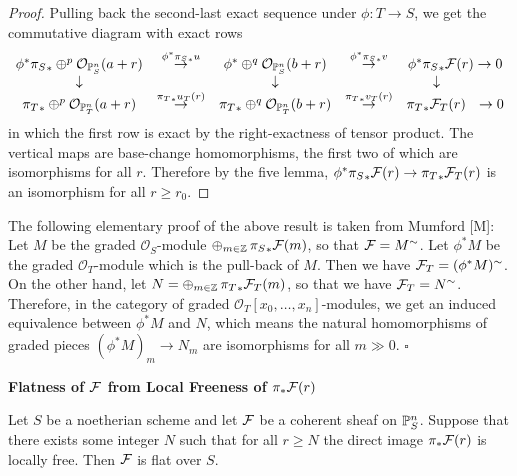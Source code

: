 \begin{proof}
Pulling back the second-last exact sequence under $\phi: T\to S$,
we get the commutative diagram with exact rows
$$\begin{array}{ccccc}
\phi^*{\pi_S}_* \oplus^p {\mathcal O}_{\mathbb{P}^n_S}(a+r) &
\stackrel{\phi^*{\pi_S}_*u}{\to} &
\phi^* \oplus^q {\mathcal O}_{\mathbb{P}^n_S}(b+r) &
\stackrel{\phi^*{\pi_S}_*v}{\to} &
\phi^*{\pi_S}_* \mathcal{F}(r) \to  0 \\
\downarrow &   & \downarrow & & \downarrow ~~~~~~~~ \\
{\pi_T}_* \oplus^p {\mathcal O}_{\mathbb{P}^n_T}(a+r) &
\stackrel{{\pi_T}_*u_T(r)}{\to} &
{\pi_T}_*   \oplus^q {\mathcal O}_{\mathbb{P}^n_T}(b+r) &
\stackrel{{\pi_T}_*v_T(r)}{\to} &
{\pi_T}_* \mathcal{F}_T(r) ~~ \to  0
\end{array}
$$
in which the first row is exact by the right-exactness of tensor product.
The vertical maps are base-change homomorphisms, the first two
of which are isomorphisms for all $r$.
Therefore by the five lemma,
$\phi^*{\pi_S}_* \mathcal{F}(r) \to {\pi_T}_* \mathcal{F}_T(r)$ is an isomorphism
for all $r\ge r_0$.
\end{proof}


\medskip



{\footnotesize
The following elementary proof of the above result is taken from Mumford [M]:
Let $M$ be the graded ${\mathcal O}_S$-module
$\oplus_{m\in \mathbb{Z}}\, {\pi_S}_* \mathcal{F}(m)$, so that $\mathcal{F} = M^{\sim}$.
Let $\phi^*M$ be the graded ${\mathcal O}_T$-module which is the pull-back of
$M$. Then we have $\mathcal{F}_T = (\phi^*M)^{\sim}$.
On the other hand, let $N = \oplus_{m\in \mathbb{Z}}\, {\pi_T}_* \mathcal{F}_T(m)$,
so that we have $\mathcal{F}_T = N^{\sim}$. Therefore, in the category of
graded ${\mathcal O}_T[x_0,\ldots,x_n]$-modules, we get an induced equivalence
between $\phi^*M$ and $N$, which means the natural homomorphisms of
graded pieces $(\phi^*M)_m \to N_m$ are isomorphisms for all $m\gg 0$.
$\square$
}%





\bigskip


\centerline{\large\bf Flatness of $\mathcal{F}$ from Local Freeness of $\pi_*\mathcal{F}(r)$}


\medskip

\begin{lemma}\label{nhq-graded-module-flat}
Let $S$ be a noetherian scheme and let $\mathcal{F}$ be a coherent sheaf on
$\mathbb{P}^n_S$. Suppose that there exists some integer $N$ such that
for all $r \ge N$ the direct image $\pi_*\mathcal{F}(r)$ is locally free.
Then $\mathcal{F}$ is flat over $S$.
\end{lemma}

